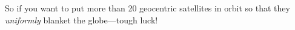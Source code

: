 So if you want to put more than 20 geocentric satellites in orbit so
that they \emph{uniformly} blanket the globe---tough luck!

\begin{problems}

\examproblems
{}

\classproblems
{}

\homeworkproblems
{}

\end{problems}


\endinput



\endinput
